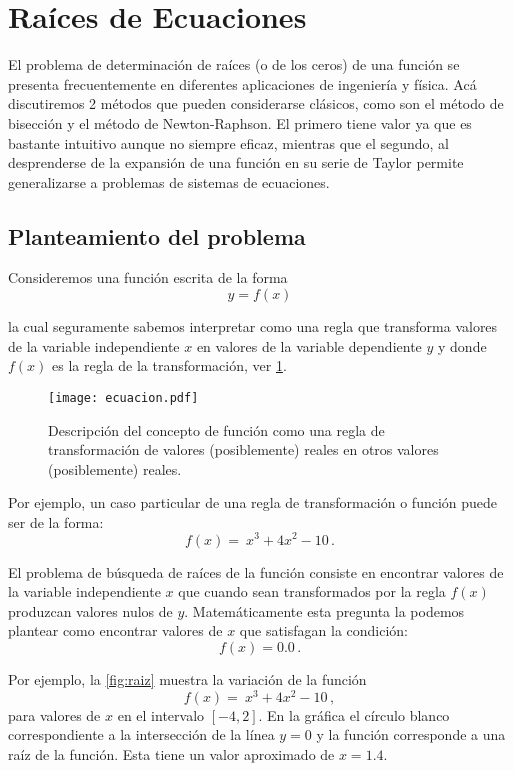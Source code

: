 \section{Raíces de Ecuaciones}
El problema de determinación de raíces (o de los ceros) de una función se 
presenta frecuentemente en diferentes aplicaciones de ingeniería y física. Acá 
discutiremos 2 métodos que pueden considerarse clásicos, como son el método de 
bisección y el método de Newton-Raphson. El primero tiene valor ya que es 
bastante intuitivo aunque no siempre eficaz, mientras que el segundo, al 
desprenderse de la expansión de una función en su serie de Taylor permite 
generalizarse a problemas de sistemas de ecuaciones.

\subsection{Planteamiento del problema}

Consideremos una función escrita de la forma
\begin{equation}
y=f(x)
\label{funcionY}
\end{equation}

la cual seguramente sabemos interpretar como una regla que transforma valores de la variable independiente $x$ en valores de la variable dependiente $y$ y donde $f(x)$ es la regla de la transformación, ver \cref{fig:ecuacion}.

\begin{figure}[H]
	\centering
	\texttt{[image: ecuacion.pdf]}
	\caption{Descripción del concepto de función como una regla de transformación de valores (posiblemente) reales  en otros valores (posiblemente) reales.}
	\label{fig:ecuacion}
\end{figure}

Por ejemplo, un caso particular de una regla de transformación o función puede 
ser de la forma:
\[f(x) = \ x^3 + 4x^2 - 10\, .\]

El problema de búsqueda de raíces de la función consiste en encontrar valores 
de la variable independiente $x$ que cuando sean transformados por la regla 
$f(x)$ produzcan valores nulos de $y$. Matemáticamente esta pregunta la podemos 
plantear como encontrar valores de $x$ que satisfagan la condición:
\[f(x) = 0.0\, .\]

Por ejemplo, la \cref{fig:raiz} muestra la variación de la función
\[f(x) = \ x^3 + 4x^2 - 10\, ,\]
para valores de $x$ en el intervalo $[-4, 2].$ En la gráfica el círculo blanco 
correspondiente a la intersección de la línea $y=0$ y la función corresponde a 
una raíz de la función. Esta tiene un valor aproximado de $x=1.4.$

